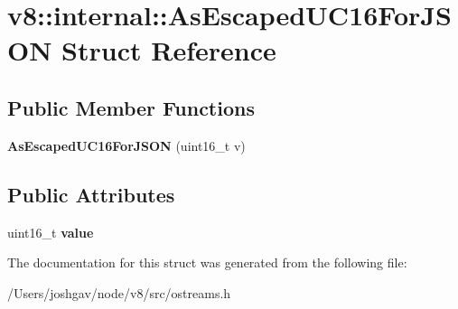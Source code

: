 \hypertarget{structv8_1_1internal_1_1_as_escaped_u_c16_for_j_s_o_n}{}\section{v8\+:\+:internal\+:\+:As\+Escaped\+U\+C16\+For\+J\+S\+ON Struct Reference}
\label{structv8_1_1internal_1_1_as_escaped_u_c16_for_j_s_o_n}
\subsection*{Public Member Functions}
\begin{DoxyCompactItemize}
\item 
{\bfseries As\+Escaped\+U\+C16\+For\+J\+S\+ON} (uint16\+\_\+t v)\hypertarget{structv8_1_1internal_1_1_as_escaped_u_c16_for_j_s_o_n_a4d97551c422a243cd107ffe34f830e2c}{}\label{structv8_1_1internal_1_1_as_escaped_u_c16_for_j_s_o_n_a4d97551c422a243cd107ffe34f830e2c}

\end{DoxyCompactItemize}
\subsection*{Public Attributes}
\begin{DoxyCompactItemize}
\item 
uint16\+\_\+t {\bfseries value}\hypertarget{structv8_1_1internal_1_1_as_escaped_u_c16_for_j_s_o_n_a5edc3c77938e90205a97c78c7ffcff05}{}\label{structv8_1_1internal_1_1_as_escaped_u_c16_for_j_s_o_n_a5edc3c77938e90205a97c78c7ffcff05}

\end{DoxyCompactItemize}


The documentation for this struct was generated from the following file\+:\begin{DoxyCompactItemize}
\item 
/\+Users/joshgav/node/v8/src/ostreams.\+h\end{DoxyCompactItemize}

